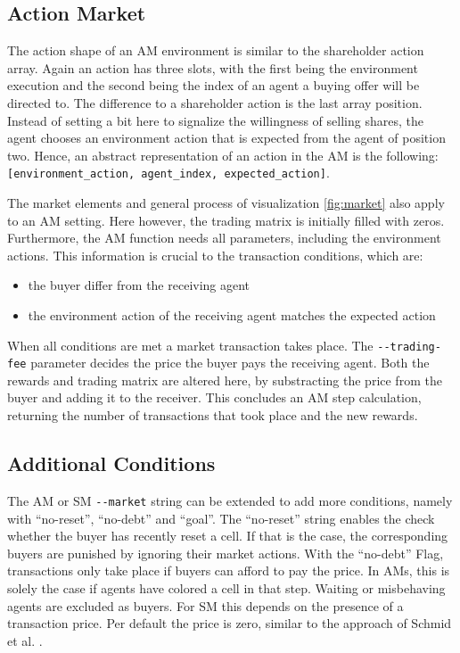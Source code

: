 \subsection{Action Market}
The action shape of an AM environment is similar to the shareholder action array. Again an action has three slots, with the first being the environment execution and the second being the index of an agent a buying offer will be directed to. The difference to a shareholder action is the last array position. Instead of setting a bit here to signalize the willingness of selling shares, the agent chooses an environment action that is expected from the agent of position two. Hence, an abstract representation of an action in the AM is the following: \verb|[environment_action, agent_index, expected_action]|.

The market elements and general process of visualization \ref{fig:market} also apply to an AM setting. Here however, the trading matrix is initially filled with zeros. Furthermore, the AM function needs all parameters, including the environment actions. This information is crucial to the transaction conditions, which are:
\begin{itemize}
    \item the buyer differ from the receiving agent
    \item the environment action of the receiving agent matches the expected action
\end{itemize}

When all conditions are met a market transaction takes place. The \verb|--trading-fee| parameter decides the price the buyer pays the receiving agent. Both the rewards and trading matrix are altered here, by substracting the price from the buyer and adding it to the receiver. This concludes an AM step calculation, returning the number of transactions that took place and the new rewards.

\subsection{Additional Conditions}
The AM or SM \verb|--market| string can be extended to add more conditions, namely with ``no-reset'', ``no-debt'' and ``goal''. The ``no-reset'' string enables the check whether the buyer has recently reset a cell. If that is the case, the corresponding buyers are punished by ignoring their market actions. With the ``no-debt'' Flag, transactions only take place if buyers can afford to pay the price. In AMs, this is solely the case if agents have colored a cell in that step. Waiting or misbehaving agents are excluded as buyers. For SM this depends on the presence of a transaction price. Per default the price is zero, similar to the approach of Schmid et al. \cite{scbe21}.

